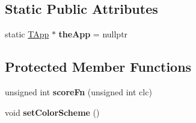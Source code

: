 \subsection*{Static Public Attributes}
\begin{DoxyCompactItemize}
\item 
\hypertarget{class_tetris_1_1_t_app_a4094b827652596527f51beb466db5d68}{static \hyperlink{class_tetris_1_1_t_app}{T\-App} $\ast$ {\bfseries the\-App} = nullptr}\label{class_tetris_1_1_t_app_a4094b827652596527f51beb466db5d68}

\end{DoxyCompactItemize}
\subsection*{Protected Member Functions}
\begin{DoxyCompactItemize}
\item 
\hypertarget{class_tetris_1_1_t_app_a6858685050efe4d337b8dced7d7ada8c}{unsigned int {\bfseries score\-Fn} (unsigned int clc)}\label{class_tetris_1_1_t_app_a6858685050efe4d337b8dced7d7ada8c}

\item 
\hypertarget{class_tetris_1_1_t_app_a8bad5ebd128c393ae2ea78c3be1100ec}{void {\bfseries set\-Color\-Scheme} ()}\label{class_tetris_1_1_t_app_a8bad5ebd128c393ae2ea78c3be1100ec}

\end{DoxyCompactItemize}
